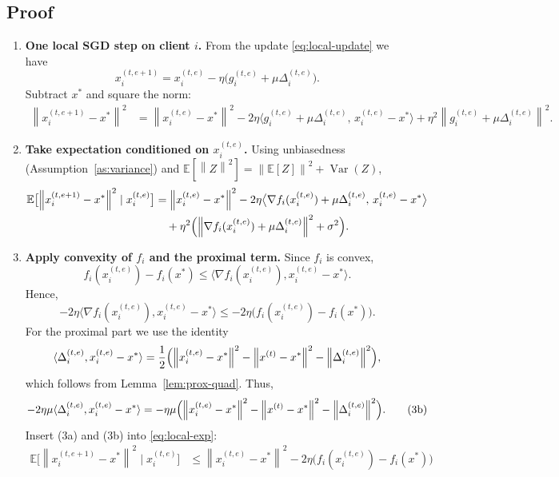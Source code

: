 \documentclass{article}
\newcommand{\E}{\mathbb{E}}
\newcommand{\norm}[1]{\left\lVert#1\right\rVert}
\begin{document}
\subsection*{Proof}
\begin{enumerate}
\item[Step 1.] \textbf{One local SGD step on client $i$.}  
From the update \eqref{eq:local-update} we have
\[
x_{i}^{(t,e+1)}=x_{i}^{(t,e)}-\eta\bigl(g_{i}^{(t,e)}+\mu\Delta_{i}^{(t,e)}\bigr).
\]
Subtract $x^{*}$ and square the norm:
\begin{align}
\norm{x_{i}^{(t,e+1)}-x^{*}}^{2}
&=\norm{x_{i}^{(t,e)}-x^{*}}^{2}
-2\eta\bigl\langle g_{i}^{(t,e)}+\mu\Delta_{i}^{(t,e)},\,x_{i}^{(t,e)}-x^{*}\bigr\rangle
+\eta^{2}\norm{g_{i}^{(t,e)}+\mu\Delta_{i}^{(t,e)}}^{2}.
\label{eq:local-squared}
\end{align}
\item[Step 2.] \textbf{Take expectation conditioned on $x_{i}^{(t,e)}$.}  
Using unbiasedness (Assumption~\ref{as:variance}) and $\E[\norm{Z}^{2}]=\norm{\E[Z]}^{2}+\operatorname{Var}(Z)$,
\begin{align}
\E\bigl[\norm{x_{i}^{(t,e+1)}-x^{*}}^{2}\mid x_{i}^{(t,e)}\bigr]
&=\norm{x_{i}^{(t,e)}-x^{*}}^{2}
-2\eta\bigl\langle \nabla f_i(x_{i}^{(t,e)})+\mu\Delta_{i}^{(t,e)},\,x_{i}^{(t,e)}-x^{*}\bigr\rangle \nonumber\\
&\quad+\eta^{2}\Bigl(\norm{\nabla f_i(x_{i}^{(t,e)})+\mu\Delta_{i}^{(t,e)}}^{2}+\sigma^{2}\Bigr).
\label{eq:local-exp}
\end{align}
\item[Step 3.] \textbf{Apply convexity of $f_i$ and the proximal term.}  
Since $f_i$ is convex,
\[
f_i(x_{i}^{(t,e)})-f_i(x^{*})\le\langle\nabla f_i(x_{i}^{(t,e)}),x_{i}^{(t,e)}-x^{*}\rangle .
\]
Hence,
\[
-2\eta\langle\nabla f_i(x_{i}^{(t,e)}),x_{i}^{(t,e)}-x^{*}\rangle
\le -2\eta\bigl(f_i(x_{i}^{(t,e)})-f_i(x^{*})\bigr).
\tag{3a}
\]
For the proximal part we use the identity
\[
\langle\Delta_{i}^{(t,e)},x_{i}^{(t,e)}-x^{*}\rangle
=\frac12\Bigl(\norm{x_{i}^{(t,e)}-x^{*}}^{2}
-\norm{x^{(t)}-x^{*}}^{2}
-\norm{\Delta_{i}^{(t,e)}}^{2}\Bigr),
\]
which follows from Lemma~\ref{lem:prox-quad}.
Thus,
\[
-2\eta\mu\langle\Delta_{i}^{(t,e)},x_{i}^{(t,e)}-x^{*}\rangle
= -\eta\mu\Bigl(\norm{x_{i}^{(t,e)}-x^{*}}^{2}
-\norm{x^{(t)}-x^{*}}^{2}
-\norm{\Delta_{i}^{(t,e)}}^{2}\Bigr).
\tag{3b}
\]
Insert (3a) and (3b) into \eqref{eq:local-exp}:
\begin{align}
\E\bigl[\norm{x_{i}^{(t,e+1)}-x^{*}}^{2}\mid x_{i}^{(t,e)}\bigr]
&\le \norm{x_{i}^{(t,e)}-x^{*}}^{2}
-2\eta\bigl(f_i(x_{i}^{(t,e)})-f_i(x^{*})\bigr) \nonumber\\

\end{align}
\end{enumerate}
\end{document}
